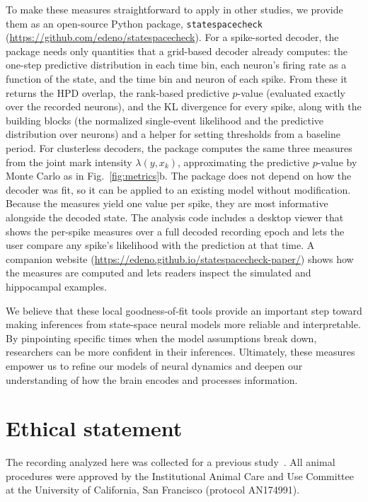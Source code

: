 \documentclass[12pt]{article}
\begin{document}
To make these measures straightforward to apply in other studies, we provide them as an open-source Python package, \texttt{statespacecheck} (\url{https://github.com/edeno/statespacecheck}). For a spike-sorted decoder, the package needs only quantities that a grid-based decoder already computes: the one-step predictive distribution in each time bin, each neuron's firing rate as a function of the state, and the time bin and neuron of each spike. From these it returns the HPD overlap, the rank-based predictive $p$-value (evaluated exactly over the recorded neurons), and the KL divergence for every spike, along with the building blocks (the normalized single-event likelihood and the predictive distribution over neurons) and a helper for setting thresholds from a baseline period. For clusterless decoders, the package computes the same three measures from the joint mark intensity $\lambda(y, x_k)$, approximating the predictive $p$-value by Monte Carlo as in Fig.~\ref{fig:metrics}b. The package does not depend on how the decoder was fit, so it can be applied to an existing model without modification. Because the measures yield one value per spike, they are most informative alongside the decoded state. The analysis code includes a desktop viewer that shows the per-spike measures over a full decoded recording epoch and lets the user compare any spike's likelihood with the prediction at that time. A companion website (\url{https://edeno.github.io/statespacecheck-paper/}) shows how the measures are computed and lets readers inspect the simulated and hippocampal examples.

We believe that these local goodness-of-fit tools provide an important step toward making inferences from state-space neural models more reliable and interpretable. By pinpointing specific times when the model assumptions break down, researchers can be more confident in their inferences. Ultimately, these measures empower us to refine our models of neural dynamics and deepen our understanding of how the brain encodes and processes information.


\section*{Ethical statement}
The recording analyzed here was collected for a previous study~\cite{ComrieHippocampalrepresentationsalternative2026}. All animal procedures were approved by the Institutional Animal Care and Use Committee at the University of California, San Francisco (protocol AN174991).
\end{document}
